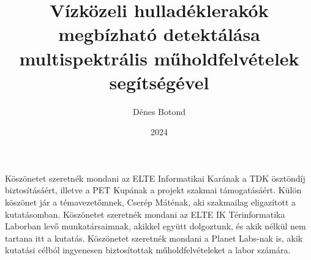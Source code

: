 \documentclass[
	final, %
]{elteiktdk}[2023/04/10]
\title{Vízközeli hulladéklerakók megbízható detektálása multispektrális műholdfelvételek segítségével}
\date{2024}
\author{Dénes Botond}
\affiliation{egyetemi tanársegéd}
\begin{document}


\makecover
\cleardoublepage
\maketitle

\tableofcontents
\cleardoublepage


\cleardoublepage


\cleardoublepage


\cleardoublepage




\cleardoublepage


\cleardoublepage

\chapter*{\acklabel}
Köszönetet szeretnék mondani az ELTE Informatikai Karának a TDK ösztöndíj biztosításáért, illetve a PET Kupának a projekt szakmai támogatásáért. Külön köszönet jár a témavezetőmnek, Cserép Máténak, aki szakmailag eligazított a kutatásomban. Köszönetet szeretnék mondani az ELTE IK Térinformatika Laborban levő munkatársaimnak, akikkel együtt dolgoztunk, és akik nélkül nem tartana itt a kutatás. Köszönetet szeretnék mondani a Planet Labs-nak is, akik kutatási célból ingyenesen biztosítottak műholdfelvételeket a labor számára.


% 

{}
\printbibliography[title=\biblabel]
\cleardoublepage

{}
\listoffigures
\cleardoublepage

{}
\listoftables
\cleardoublepage



\end{document}
